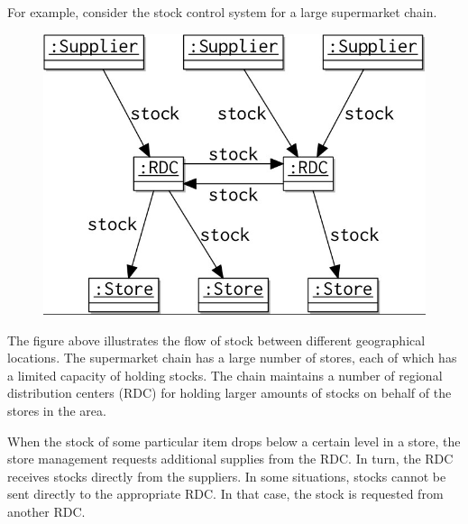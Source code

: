 \documentclass[a4paper, openany]{memoir}
\begin{document}
For example, consider the stock control system for a large supermarket chain.
\begin{figure}[H]
    \centering
    \includegraphics[scale=0.4]{src/14.10 Stock 1.png}
\end{figure}
\noindent The figure above illustrates the flow of stock between different geographical locations. The supermarket chain has a large number of stores, each of which has a limited capacity of holding stocks. The chain maintains a number of regional distribution centers (RDC) for holding larger amounts of stocks on behalf of the stores in the area. 

When the stock of some particular item drops below a certain level in a store, the store management requests additional supplies from the RDC. In turn, the RDC receives stocks directly from the suppliers. In some situations, stocks cannot be sent directly to the appropriate RDC. In that case, the stock is requested from another RDC.
\end{document}
